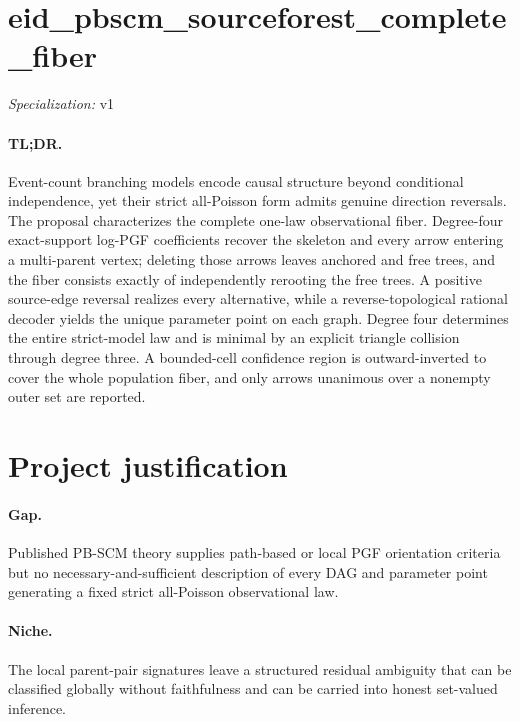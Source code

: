 \documentclass{article}
\begin{document}
\sloppy

\section*{eid\_\allowbreak{}pbscm\_\allowbreak{}sourceforest\_\allowbreak{}complete\_\allowbreak{}fiber}

\noindent\textit{Specialization:} v1\par

\paragraph{TL;DR.} Event-count branching models encode causal structure beyond conditional independence, yet their strict all-Poisson form admits genuine direction reversals. The proposal characterizes the complete one-law observational fiber. Degree-four exact-support log-PGF coefficients recover the skeleton and every arrow entering a multi-parent vertex; deleting those arrows leaves anchored and free trees, and the fiber consists exactly of independently rerooting the free trees. A positive source-edge reversal realizes every alternative, while a reverse-topological rational decoder yields the unique parameter point on each graph. Degree four determines the entire strict-model law and is minimal by an explicit triangle collision through degree three. A bounded-cell confidence region is outward-inverted to cover the whole population fiber, and only arrows unanimous over a nonempty outer set are reported.

\section{Project justification}

\paragraph{Gap.} Published PB-SCM theory supplies path-based or local PGF orientation criteria but no necessary-and-sufficient description of every DAG and parameter point generating a fixed strict all-Poisson observational law.

\paragraph{Niche.} The local parent-pair signatures leave a structured residual ambiguity that can be classified globally without faithfulness and can be carried into honest set-valued inference.
\end{document}

